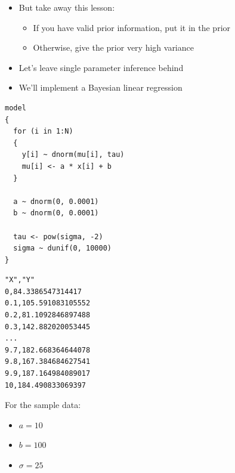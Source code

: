 \documentclass{beamer}
\begin{document}
\begin{frame}[fragile]
  \begin{itemize}
    \item{But take away this lesson:}
    \begin{itemize}
      \item{If you have valid prior information, put it in the prior}
      \item{Otherwise, give the prior very high variance}
    \end{itemize}
  \end{itemize}
\end{frame}

\begin{frame}[fragile]
  \begin{itemize}
    \item{Let's leave single parameter inference behind}
    \item{We'll implement a Bayesian linear regression}
  \end{itemize}
\end{frame}

\begin{frame}[fragile]
  \begin{verbatim}
model
{
  for (i in 1:N)
  {
    y[i] ~ dnorm(mu[i], tau)
    mu[i] <- a * x[i] + b
  }
  
  a ~ dnorm(0, 0.0001)
  b ~ dnorm(0, 0.0001)
  
  tau <- pow(sigma, -2)
  sigma ~ dunif(0, 10000)
}
  \end{verbatim}
\end{frame}

\begin{frame}[fragile]
  \begin{verbatim}
"X","Y"
0,84.3386547314417
0.1,105.591083105552
0.2,81.1092846897488
0.3,142.882020053445
...
9.7,182.668364644078
9.8,167.384684627541
9.9,187.164984089017
10,184.490833069397
  \end{verbatim}
\end{frame}

\begin{frame}
  For the sample data:
  \begin{itemize}
    \item{$a = 10$}
    \item{$b = 100$}
    \item{$\sigma = 25$}
  \end{itemize}
\end{frame}
\end{document}
